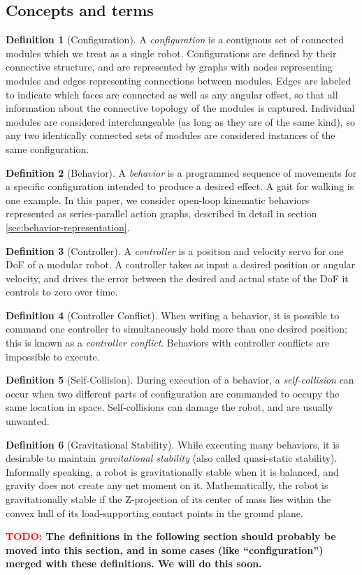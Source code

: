 \documentclass[conference]{IEEEtran}
\theoremstyle{definition}
\newtheorem{definition}{Definition}[section]
\newcommand{\TODO}[1]{ {\bf \textcolor{red}{TODO:} #1 }}
\begin{document}
\subsection{Concepts and terms}
\begin{definition}[Configuration]
A \textit{configuration} is a contiguous set of connected modules which we treat as a
single robot.  Configurations are defined by their connective structure, and
are represented by graphs with nodes representing modules and edges
representing connections between modules.  Edges are labeled to indicate which
faces are connected as well as any angular offset, so that all information
about the connective topology of the modules is captured.  Individual modules
are considered interchangeable (as long as they are of the same kind), so any
two identically connected sets of modules are considered instances of the same
configuration.
\end{definition}
\begin{definition}[Behavior]
A \textit{behavior} is a programmed sequence of movements for a specific configuration
intended to produce a desired effect.  A gait for walking is one example.  In
this paper, we consider open-loop kinematic behaviors represented as
series-parallel action graphs, described in detail in section
\ref{sec:behavior-representation}.
\end{definition}
\begin{definition}[Controller]
A \textit{controller} is a position and velocity servo for one DoF of a modular
robot.  A controller takes as input a desired position or angular velocity, and
drives the error between the desired and actual state of the DoF it controls to
zero over time.
\end{definition}
\begin{definition}[Controller Conflict]
When writing a behavior, it is possible to command one controller to
simultaneously hold more than one desired position; this is known as a
\textit{controller conflict}.  Behaviors with controller conflicts are
impossible to execute.
\end{definition}
\begin{definition}[Self-Collision]
During execution of a behavior, a \textit{self-collision} can occur when two
different parts of configuration are commanded to occupy the same location in
space.  Self-collisions can damage the robot, and are usually unwanted.
\end{definition}
\begin{definition}[Gravitational Stability]
While executing many behaviors, it is desirable to maintain \textit{gravitational
stability} (also called quasi-static stability).  Informally speaking, a
robot is gravitationally stable when it is balanced, and gravity does not
create any net moment on it.  Mathematically, the robot is gravitationally stable
if the Z-projection of its center of
mass lies within the convex hull of its load-supporting contact points in the
ground plane.
\end{definition}
\TODO{The definitions in the following section should probably be moved into this
section, and in some cases (like ``configuration'') merged with these definitions.  We will do this soon.}
\end{document}
